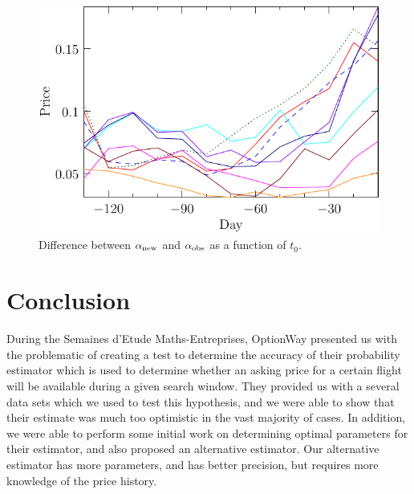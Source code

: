 \documentclass{article}
\def\anew{\alpha_{\rm{new}}}
\begin{document}
\begin{figure}
  \begin{center}
    \includegraphics{pdf/plotA1}
    \caption{Difference between $\anew$ and $\alpha_{\rm{obs}}$ as a
      function of $t_0$.}
    \label{plotA1}
  \end{center}
\end{figure}

\section{Conclusion}

During the Semaines d'Etude Maths-Entreprises, OptionWay presented us
with the problematic of creating a test to determine the accuracy of
their probability estimator which is used to determine whether an
asking price for a certain flight will be available during a given
search window.  They provided us with a several data sets which we
used to test this hypothesis, and we were able to show that their
estimate was much too optimistic in the vast majority of cases.  In
addition, we were able to perform some initial work on determining
optimal parameters for their estimator, and also proposed an
alternative estimator.  Our alternative estimator has more parameters,
and has better precision, but requires more knowledge of the price
history.
\end{document}
